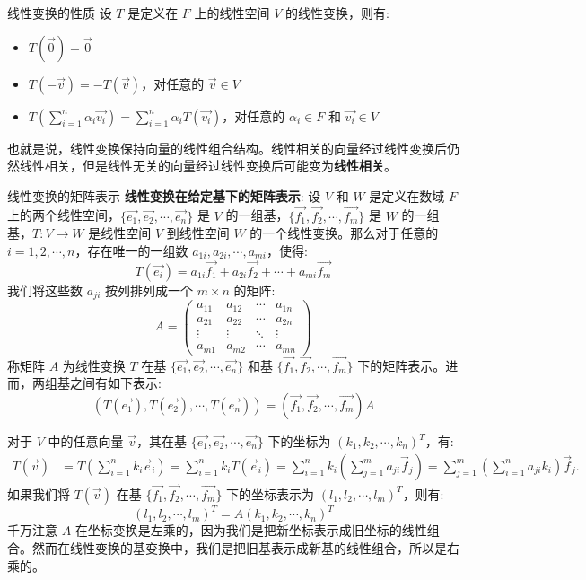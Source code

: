 \documentclass[a4paper,12pt]{ctexart}
\begin{document}
\newpage

\begin{myprop}{线性变换的性质}{}
设 $T$ 是定义在 $F$ 上的线性空间 $V$ 的线性变换，则有:
\begin{itemize}
    \item $T(\vec{0}) = \vec{0}$
    \item $T(-\vec{v}) = -T(\vec{v})$，对任意的 $\vec{v} \in V$
    \item $T\left(\sum_{i=1}^{n} \alpha_i \vec{v_i}\right) = \sum_{i=1}^{n} \alpha_i T(\vec{v_i})$，对任意的 $\alpha_i \in F$ 和 $\vec{v_i} \in V$
\end{itemize}
也就是说，线性变换保持向量的线性组合结构。线性相关的向量经过线性变换后仍然线性相关，但是线性无关的向量经过线性变换后可能变为\textbf{线性相关}。
\end{myprop}

\begin{mythm}{线性变换的矩阵表示}{}
    \textbf{线性变换在给定基下的矩阵表示}: 设 $V$ 和 $W$ 是定义在数域 $F$ 上的两个线性空间，$\{\vec{e_1}, \vec{e_2}, \cdots, \vec{e_n}\}$ 是 $V$ 的一组基，$\{\vec{f_1}, \vec{f_2}, \cdots, \vec{f_m}\}$ 是 $W$ 的一组基，$T: V \to W$ 是线性空间 $V$ 到线性空间 $W$ 的一个线性变换。那么对于任意的 $i = 1, 2, \cdots, n$，存在唯一的一组数 $a_{1i}, a_{2i}, \cdots, a_{mi}$，使得:
    \[
    T(\vec{e_i}) = a_{1i} \vec{f_1} + a_{2i} \vec{f_2} + \cdots + a_{mi} \vec{f_m}
    \]
    我们将这些数 $a_{ji}$ 按列排列成一个 $m \times n$ 的矩阵:
    \[
    A = \begin{pmatrix}
    a_{11} & a_{12} & \cdots & a_{1n} \\
    a_{21} & a_{22} & \cdots & a_{2n} \\
    \vdots & \vdots & \ddots & \vdots \\
    a_{m1} & a_{m2} & \cdots & a_{mn}
    \end{pmatrix}
    \]
    称矩阵 $A$ 为线性变换 $T$ 在基 $\{\vec{e_1}, \vec{e_2}, \cdots, \vec{e_n}\}$ 和基 $\{\vec{f_1}, \vec{f_2}, \cdots, \vec{f_m}\}$ 下的矩阵表示。进而，两组基之间有如下表示:
    \[
    (T(\vec{e_1}), T(\vec{e_2}), \cdots, T(\vec{e_n})) = (\vec{f_1}, \vec{f_2}, \cdots, \vec{f_m}) A
    \]
    
    对于 $V$ 中的任意向量 $\vec{v}$，其在基 $\{\vec{e_1}, \vec{e_2}, \cdots, \vec{e_n}\}$ 下的坐标为 $(k_1, k_2, \cdots, k_n)^T$，有:
    \[
    \begin{aligned}
    T(\vec{v}) &= T\left( \sum_{i=1}^n k_i \vec{e}_i \right)
    = \sum_{i=1}^n k_i T(\vec{e}_i)
    = \sum_{i=1}^n k_i \left( \sum_{j=1}^m a_{ji} \vec{f}_j \right) 
    = \sum_{j=1}^m \left( \sum_{i=1}^n a_{ji} k_i \right) \vec{f}_j.
    \end{aligned}
    \]
    如果我们将 $T(\vec{v})$ 在基 $\{\vec{f_1}, \vec{f_2}, \cdots, \vec{f_m}\}$ 下的坐标表示为 $(l_1, l_2, \cdots, l_m)^T$，则有:
    \[
    (l_1, l_2, \cdots, l_m)^T = A (k_1, k_2, \cdots, k_n)^T
    \]
    千万注意 $A$ 在坐标变换是左乘的，因为我们是把新坐标表示成旧坐标的线性组合。然而在线性变换的基变换中，我们是把旧基表示成新基的线性组合，所以是右乘的。
\end{mythm}
\end{document}
